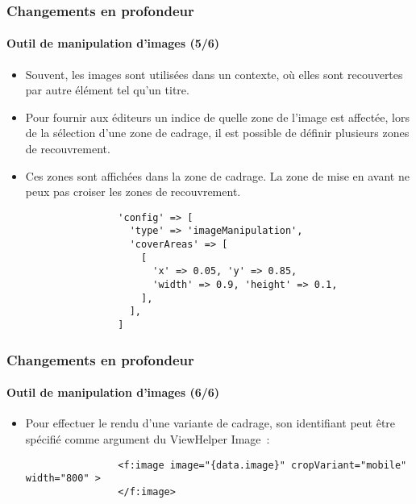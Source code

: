 \begin{frame}[fragile]
	\frametitle{Changements en profondeur}
	\framesubtitle{Outil de manipulation d'images (5/6)}

	\lstset{basicstyle=\tiny\ttfamily}

	\begin{itemize}
		\item Souvent, les images sont utilisées dans un contexte, où elles sont recouvertes
			par autre élément tel qu'un titre.
		\item Pour fournir aux éditeurs un indice de quelle zone de l'image est affectée,
			lors de la sélection d'une zone de cadrage, il est possible de définir plusieurs
			zones de recouvrement.
		\item Ces zones sont affichées dans la zone de cadrage. La zone de mise en avant
			ne peux pas croiser les zones de recouvrement.

			\begin{lstlisting}
				'config' => [
				  'type' => 'imageManipulation',
				  'coverAreas' => [
				    [
				      'x' => 0.05, 'y' => 0.85,
				      'width' => 0.9, 'height' => 0.1,
				    ],
				  ],
				]
			\end{lstlisting}

	\end{itemize}

\end{frame}


\begin{frame}[fragile]
	\frametitle{Changements en profondeur}
	\framesubtitle{Outil de manipulation d'images (6/6)}

	\lstset{basicstyle=\smaller\ttfamily}

	\begin{itemize}
		\item Pour effectuer le rendu d'une variante de cadrage, son identifiant peut être
			spécifié comme argument du ViewHelper Image~:

			\begin{lstlisting}
				<f:image image="{data.image}" cropVariant="mobile" width="800" >
				</f:image>
			\end{lstlisting}

	\end{itemize}

\end{frame}

